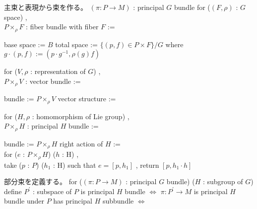 \begin{Definition}
\itemnote
  主束と表現から束を作る。
\itemwhen \((\pi : P \to M)\) : principal \(G\) bundle
\itemdefi
  for (\((F , \rho)\) : \(G\) space) ,\\
  \(P \times_{\rho} F\) : fiber bundle with fiber \(F\) :=
  \begin{itemize}
    \itemenum base space := \(B\)
    \itemenum total space := \(\{(p , f) \in P \times F\} / G\) where \\
      \(g \cdot (p , f) := (p \cdot g^{-1} , \rho(g) f)\)
  \end{itemize}
\itemdefi
  for (\(V , \rho\) : representation of \(G\)) ,\\
  \(P \times_{\rho} V\) : vector bundle :=
  \begin{itemize}
    \itemenum bundle := \(P \times_{\rho} V\)
    \itemenum vector structure := 
  \end{itemize}
\itemdefi
  for (\(H , \rho\) : homomorphism of Lie group) ,\\
  \(P \times_{\rho} H\) : principal \(H\) bundle :=
  \begin{itemize}
    \itemenum bundle := \(P \times_{\rho} H\)
    \itemenum right action of \(H\) := \\
    for (\(e\) : \(P \times_{\rho} H\)) (\(h\) : H) ,\\
    take (\(p\) : \(P\)) (\(h_1\) : H) such that \(e = [p , h_1]\) ,
    return \([p , h_1 \cdot h]\)
  \end{itemize}
\end{Definition}

\begin{Definition}
\itemnote
  部分束を定義する。
\itemdefi
  for (\((\pi : P \to M)\) : principal \(G\) bundle) (\(H\) : subgroup of \(G\))\\
  define \(P^{\prime}\) : subspace of \(P\) is principal \(H\) bundle \(\iff\)
  \(\pi : P^{\prime} \to M\) is principal \(H\) bundle under 
\itemprop
  \(P\) has principal \(H\) subbundle \(\iff\) 
\end{Definition}

